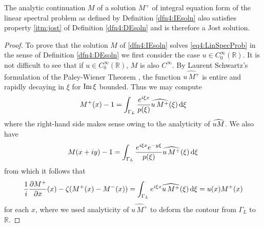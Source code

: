 \documentclass[../dissertation.tex]{subfiles}
\begin{document}
\begin{lma}\label{lma4:IEtoDE5}
	The analytic continuation $M$ of 
	a solution $M^+$ of integral equation form of the linear spectral problem 
	as defined by Definition \ref{dfn4:IEsoln} also satisfies property \ref{itm:jost}
	of Definition \ref{dfn4:DEsoln} and is therefore a Jost solution.
\end{lma}
\begin{proof}
	To prove that the solution $M$ of \eqref{dfn4:IEsoln} solves 
	\eqref{eq4:LinSpecProb} in the sense of Definition \ref{dfn4:DEsoln} we 
	first consider the case $u \in C_0^\infty(\mathbb R)$. It is not dif{}ficult to 
	see that if $u \in C_0^\infty(\mathbb R)$, $M$ is also $C^\infty$. By Laurent 
	Schwartz's formulation of the Paley-Wiener Theorem \cite{Schwartz1952}, the 
	function $\widehat{u\,M^+}$ is entire and rapidly decaying in $\xi$ for 
	$\operatorname{Im} \xi$ bounded. Thus we may compute 
	\[ 
		M^+(x) - 1 
			= \int_{\Gamma_L} \frac{e^{i\xi x}}{p(\xi)} \widehat{u\,M^+}(\xi) \, \mathrm{d}\xi
	\]
	where the right-hand side makes sense owing to the analyticity of $\widehat{uM}$. 
	We also have
	\[
		M(x+iy) - 1 
			= 
				\int_{\Gamma_L} 
					\frac{e^{i\xi x} e^{-y\xi}}{p(\xi)} \widehat{u\,M^+}(\xi) 
				\, \mathrm{d}\xi
	\]
	from which it follows that
	\[ 
		\frac{1}{i} \frac{\partial M^+}{\partial x}(x)  - \zeta(M^+(x) - M^-(x))
			=	\int_{\Gamma_L} e^{i\xi x} \widehat{u\,M^+}(\xi) \, \mathrm{d}\xi 
			= u(x) M^+(x)
	\]
	for each $x$, where we used analyticity of $\widehat{u\,M^+}$ to deform the 
	contour from $\Gamma_L$ to $\mathbb R$. 


\end{proof}
\end{document}
